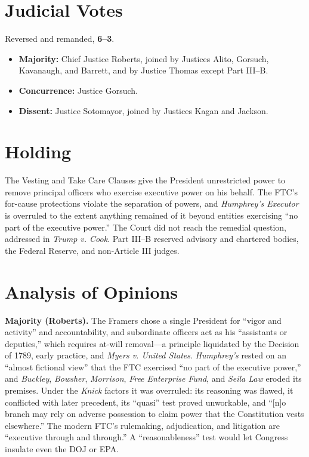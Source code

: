 \documentclass[12pt]{article}
\begin{document}
\section{Judicial Votes}

Reversed and remanded, \textbf{6--3}.
\begin{itemize}
\item \textbf{Majority:} Chief Justice Roberts, joined by Justices Alito, Gorsuch, Kavanaugh, and Barrett, and by Justice Thomas except Part III--B.
\item \textbf{Concurrence:} Justice Gorsuch.
\item \textbf{Dissent:} Justice Sotomayor, joined by Justices Kagan and Jackson.
\end{itemize}

\section{Holding}

The Vesting and Take Care Clauses give the President unrestricted power to remove principal officers who exercise executive power on his behalf. The FTC's for-cause protections violate the separation of powers, and \textit{Humphrey's Executor} is overruled to the extent anything remained of it beyond entities exercising ``no part of the executive power.'' The Court did not reach the remedial question, addressed in \textit{Trump v. Cook}. Part III--B reserved advisory and chartered bodies, the Federal Reserve, and non-Article III judges.

\section{Analysis of Opinions}

\textbf{Majority (Roberts).} The Framers chose a single President for ``vigor and activity'' and accountability, and subordinate officers act as his ``assistants or deputies,'' which requires at-will removal---a principle liquidated by the Decision of 1789, early practice, and \textit{Myers v. United States}. \textit{Humphrey's} rested on an ``almost fictional view'' that the FTC exercised ``no part of the executive power,'' and \textit{Buckley}, \textit{Bowsher}, \textit{Morrison}, \textit{Free Enterprise Fund}, and \textit{Seila Law} eroded its premises. Under the \textit{Knick} factors it was overruled: its reasoning was flawed, it conflicted with later precedent, its ``quasi'' test proved unworkable, and ``[n]o branch may rely on adverse possession to claim power that the Constitution vests elsewhere.'' The modern FTC's rulemaking, adjudication, and litigation are ``executive through and through.'' A ``reasonableness'' test would let Congress insulate even the DOJ or EPA.
\end{document}

